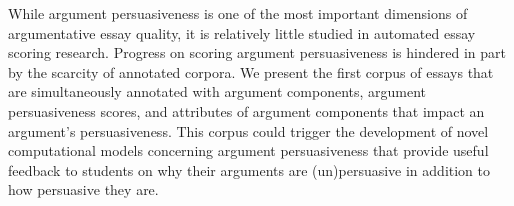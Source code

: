 While argument persuasiveness is one of the most important dimensions of argumentative essay quality, it is relatively little studied in automated essay scoring research. Progress on scoring argument persuasiveness is hindered in part by the scarcity of annotated corpora. We present the first corpus of essays that are simultaneously annotated with argument components, argument persuasiveness scores, and attributes of argument components that impact an argument's persuasiveness. This corpus could trigger the development of novel computational models concerning argument persuasiveness that provide useful feedback to students on why their arguments are (un)persuasive in addition to how persuasive they are.
